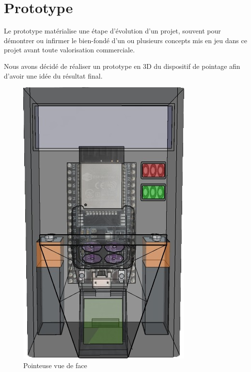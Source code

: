 \section{Prototype}
Le prototype matérialise une étape d’évolution d’un projet, souvent pour
démontrer ou infirmer le bien-fondé d’un ou plusieurs concepts mis en jeu dans
ce projet avant toute valorisation commerciale.

Nous avons décidé de réaliser un prototype en 3D du dispositif de pointage afin 
d’avoir une idée du résultat final.

\clearpage

\begin{figure}[!htb]
    \begin{minipage}{0.5\textwidth}
        \centering
        \includegraphics[scale=0.6]{images/prototype/1.png}
        \caption{Pointeuse vue de face}\label{ }
    \end{minipage}\hfill
    \begin{minipage}{0.5\textwidth}
        \centering

\end{minipage}
\end{figure}
